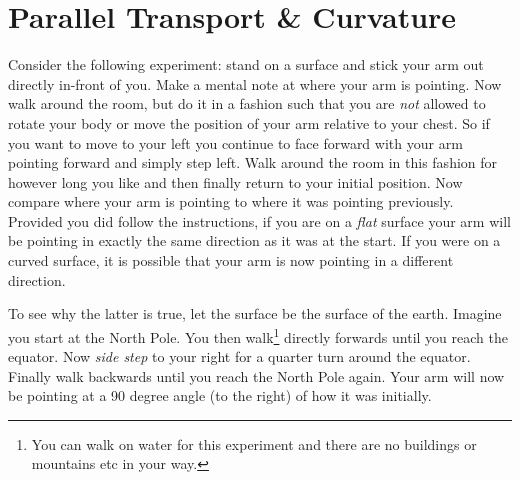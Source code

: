 \chapter{Parallel Transport \& Curvature}

Consider the following experiment: stand on a surface and stick your arm out directly in-front of you. Make a mental note at where your arm is pointing. Now walk around the room, but do it in a fashion such that you are \textit{not} allowed to rotate your body or move the position of your arm relative to your chest. So if you want to move to your left you continue to face forward with your arm pointing forward and simply step left. Walk around the room in this fashion for however long you like and then finally return to your initial position. Now compare where your arm is pointing to where it was pointing previously. Provided you did follow the instructions, if you are on a \textit{flat} surface your arm will be pointing in exactly the same direction as it was at the start. If you were on a curved surface, it is possible that your arm is now pointing in a different direction.

To see why the latter is true, let the surface be the surface of the earth. Imagine you start at the North Pole. You then walk\footnote{You can walk on water for this experiment and there are no buildings or mountains etc in your way.} directly forwards until you reach the equator. Now \textit{side step} to your right for a quarter turn around the equator. Finally walk backwards until you reach the North Pole again. Your arm will now be pointing at a 90 degree angle (to the right) of how it was initially. 

